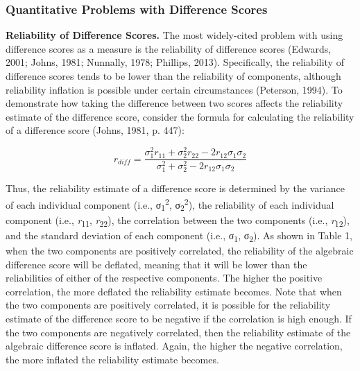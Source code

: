 \documentclass[authordate, meta]{jote-new-article}
\begin{document}
	\subsubsection{Quantitative Problems with Difference Scores}



	\textbf{Reliability of Difference Scores. }The most widely-cited problem with using difference scores as a measure is the reliability of difference scores (Edwards, 2001; Johns, 1981; Nunnally, 1978; Phillips, 2013). Specifically, the reliability of difference scores tends to be lower than the reliability of components, although reliability inflation is possible under certain circumstances (Peterson, 1994). To demonstrate how taking the difference between two scores affects the reliability estimate of the difference score, consider the formula for calculating the reliability of a difference score (Johns, 1981, p. 447):



	\begin{equation}
		r_{diff}=\frac{\sigma_1^2r_{11}+\sigma_2^2r_{22}-2r_{12}\sigma_1\sigma_2}{\sigma_1^2+\sigma_2^2-2r_{12}\sigma_1\sigma_2}
	\end{equation}



	Thus, the reliability estimate of a difference score is determined by the variance of each individual component (i.e., σ\textsubscript{1}\textsuperscript{2}, σ\textsubscript{2}\textsuperscript{2}), the reliability of each individual component (i.e., \emph{r}\textsubscript{11}, \emph{r}\textsubscript{22}), the correlation between the two components (i.e., \emph{r}\textsubscript{12}), and the standard deviation of each component (i.e., σ\textsubscript{1}, σ\textsubscript{2}). As shown in Table 1, when the two components are positively correlated, the reliability of the algebraic difference score will be deflated, meaning that it will be lower than the reliabilities of either of the respective components. The higher the positive correlation, the more deflated the reliability estimate becomes. Note that when the two components are positively correlated, it is possible for the reliability estimate of the difference score to be negative if the correlation is high enough. If the two components are negatively correlated, then the reliability estimate of the algebraic difference score is inflated. Again, the higher the negative correlation, the more inflated the reliability estimate becomes.
\end{document}
